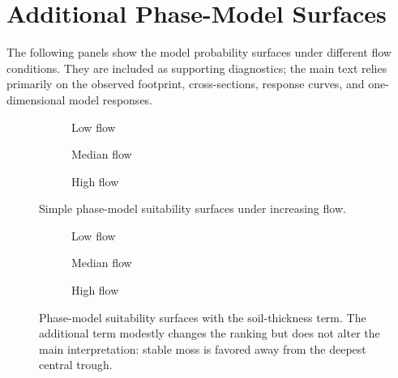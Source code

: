 \documentclass[11pt,a4paper]{article}
\begin{document}
\appendix
\section{Additional Phase-Model Surfaces}

The following panels show the model probability surfaces under different flow
conditions. They are included as supporting diagnostics; the main text relies
primarily on the observed footprint, cross-sections, response curves, and
one-dimensional model responses.

\begin{figure}[H]
  \centering
  \begin{subfigure}[t]{0.32\linewidth}
    \centering
    \caption{Low flow}
  \end{subfigure}
  \hfill
  \begin{subfigure}[t]{0.32\linewidth}
    \centering
    \caption{Median flow}
  \end{subfigure}
  \hfill
  \begin{subfigure}[t]{0.32\linewidth}
    \centering
    \caption{High flow}
  \end{subfigure}
  \caption{Simple phase-model suitability surfaces under increasing flow.}
  \label{fig:simple-phase-surfaces}
\end{figure}

\begin{figure}[H]
  \centering
  \begin{subfigure}[t]{0.32\linewidth}
    \centering
    \caption{Low flow}
  \end{subfigure}
  \hfill
  \begin{subfigure}[t]{0.32\linewidth}
    \centering
    \caption{Median flow}
  \end{subfigure}
  \hfill
  \begin{subfigure}[t]{0.32\linewidth}
    \centering
    \caption{High flow}
  \end{subfigure}
  \caption{Phase-model suitability surfaces with the soil-thickness term. The
  additional term modestly changes the ranking but does not alter the main
  interpretation: stable moss is favored away from the deepest central trough.}
  \label{fig:thickness-phase-surfaces}
\end{figure}
\end{document}
